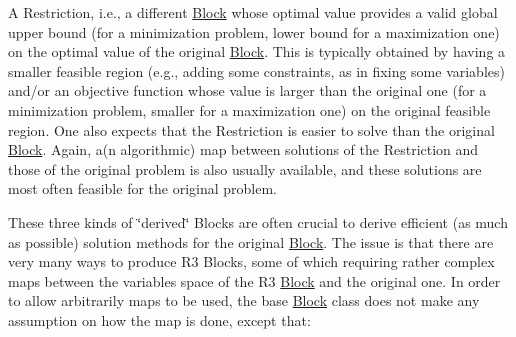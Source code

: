 \begin{Indent}
{\begin{DoxyItemize}
\item A Restriction, i.\+e., a different \mbox{\hyperlink{class_s_m_spp__di__unipi__it_1_1_block}{Block}} whose optimal value provides a valid global upper bound (for a minimization problem, lower bound for a maximization one) on the optimal value of the original \mbox{\hyperlink{class_s_m_spp__di__unipi__it_1_1_block}{Block}}. This is typically obtained by having a smaller feasible region (e.\+g., adding some constraints, as in fixing some variables) and/or an objective function whose value is larger than the original one (for a minimization problem, smaller for a maximization one) on the original feasible region. One also expects that the Restriction is easier to solve than the original \mbox{\hyperlink{class_s_m_spp__di__unipi__it_1_1_block}{Block}}. Again, a(n algorithmic) map between solutions of the Restriction and those of the original problem is also usually available, and these solutions are most often feasible for the original problem.
\end{DoxyItemize}

These three kinds of \char`\"{}derived\char`\"{} Blocks are often crucial to derive efficient (as much as possible) solution methods for the original \mbox{\hyperlink{class_s_m_spp__di__unipi__it_1_1_block}{Block}}. The issue is that there are very many ways to produce R3 Blocks, some of which requiring rather complex maps between the variables space of the R3 \mbox{\hyperlink{class_s_m_spp__di__unipi__it_1_1_block}{Block}} and the original one. In order to allow arbitrarily maps to be used, the base \mbox{\hyperlink{class_s_m_spp__di__unipi__it_1_1_block}{Block}} class does not make any assumption on how the map is done, except that\+:


}
\end{Indent}
